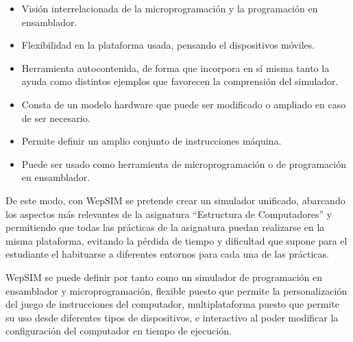 \begin{itemize}
	\item Visión interrelacionada de la microprogramación y la programación en ensamblador.
	\item Flexibilidad en la plataforma usada, pensando el dispositivos móviles.
	\item Herramienta autocontenida, de forma que incorpora en sí misma tanto la ayuda como distintos ejemplos que favorecen la comprensión del simulador.
	\item Consta de un modelo hardware que puede ser modificado o ampliado en caso de ser necesario.
	\item Permite definir un amplio conjunto de instrucciones máquina.
	\item Puede ser usado como herramienta de microprogramación o de programación en ensamblador.
\end{itemize}

\begin{table}[htbp]
\centering
\caption{Comparación de simuladores de ensamblador y microcódigo.}
\label{tab:comparison_frameworks}
\end{table}

De este modo, con WepSIM se pretende crear un simulador unificado, abarcando los aspectos más relevantes de la asignatura ``Estructura de Computadores'' y permitiendo que todas las prácticas de la asignatura puedan realizarse en la misma plataforma, evitando la pérdida de tiempo y dificultad que supone para el estudiante el habituarse a diferentes entornos para cada una de las prácticas.

WepSIM se puede definir por tanto como un simulador de programación en ensamblador y microprogramación, flexible puesto que permite la personalización del juego de instrucciones del computador, multiplataforma puesto que permite su uso desde diferentes tipos de dispositivos, e interactivo al poder modificar la configuración del computador en tiempo de ejecución.


